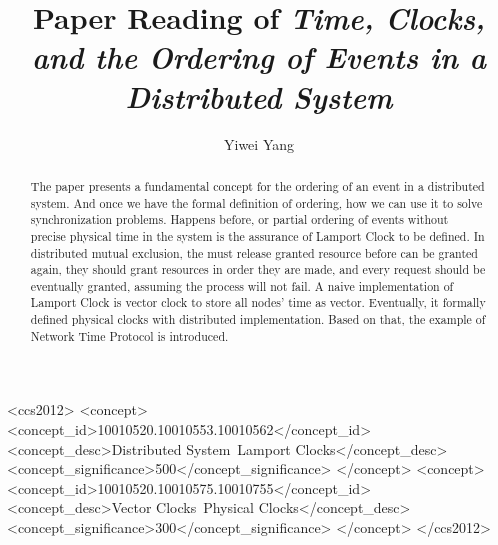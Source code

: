\documentclass[acmlarge]{acmart}
\begin{document}
\title{Paper Reading of \textit{Time, Clocks, and the Ordering of Events in a Distributed System}}

\author{Yiwei Yang}

\renewcommand{\shortauthors}{Trovato and Tobin, et al.}

\begin{abstract}
  The paper \cite{lamport2019time} presents a fundamental concept for the ordering of an event in a distributed system.
  And once we have the formal definition of ordering, how we can use it to solve synchronization
  problems. Happens before, or partial ordering of events without precise physical time in the system
  is the assurance of Lamport Clock to be defined. In distributed mutual exclusion, the must release
  granted resource before can be granted again, they should grant resources in order they are made, and
  every request should be eventually granted, assuming the process will not fail. A naive implementation of
  Lamport Clock is vector clock to store all nodes' time as vector. Eventually, it formally defined physical clocks
  with distributed implementation. Based on that, the example of Network Time Protocol is introduced.
\end{abstract}

\begin{CCSXML}
  <ccs2012>
  <concept>
  <concept_id>10010520.10010553.10010562</concept_id>
  <concept_desc>Distributed System~Lamport Clocks</concept_desc>
  <concept_significance>500</concept_significance>
  </concept>
  <concept>
  <concept_id>10010520.10010575.10010755</concept_id>
  <concept_desc>Vector Clocks~Physical Clocks</concept_desc>
  <concept_significance>300</concept_significance>
  </concept>
  </ccs2012>
\end{CCSXML}
\end{document}
